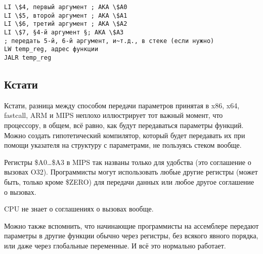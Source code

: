 \begin{lstlisting}[caption=MIPS (соглашение о вызовах O32),style=customasmMIPS]
LI \$4, первый аргумент ; AKA \$A0
LI \$5, второй аргумент ; AKA \$A1
LI \$6, третий аргумент ; AKA \$A2
LI \$7, §4-й аргумент §; AKA \$A3
; передать 5-й, 6-й аргумент, и~т.д., в стеке (если нужно)
LW temp_reg, адрес функции
JALR temp_reg
\end{lstlisting}

\subsection{Кстати}

Кстати, разница между способом передачи параметров принятая в x86, x64, fastcall, ARM и MIPS неплохо иллюстрирует тот важный момент, что процессору, в общем, всё равно, как будут 
передаваться параметры функций. Можно создать гипотетический компилятор, который будет передавать их при 
помощи указателя на структуру с параметрами, не пользуясь стеком вообще.

Регистры \$A0\dots \$A3 в MIPS так названы только для удобства (это соглашение о вызовах O32).
Программисты могут использовать любые другие регистры (может быть, только кроме \$ZERO) для
передачи данных или любое другое соглашение о вызовах.

\ac{CPU} не знает о соглашениях о вызовах вообще.

Можно также вспомнить, что начинающие программисты на ассемблере передают параметры 
в другие функции обычно через регистры, без всякого явного порядка, или даже через глобальные переменные.
И всё это нормально работает.

